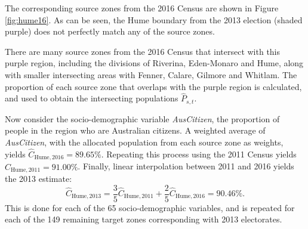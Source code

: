 \documentclass[11pt,a4paper,]{article}
\let\origtable\table
\let\endorigtable\endtable
\renewenvironment{table}[1][2] {
    \expandafter\origtable\expandafter[htbp]
} {
    \endorigtable
}
\begin{document}
The corresponding source zones from the 2016 Census are shown in Figure
\ref{fig:hume16}. As can be seen, the Hume boundary from the 2013
election (shaded purple) does not perfectly match any of the source
zones.

There are many source zones from the 2016 Census that intersect with
this purple region, including the divisions of Riverina, Eden-Monaro and
Hume, along with smaller intersecting areas with Fenner, Calare, Gilmore
and Whitlam. The proportion of each source zone that overlaps with the
purple region is calculated, and used to obtain the intersecting
populations \(\hat{P}_{s,t}\).

\begin{table}[H]
\centering\begingroup\fontsize{10}{12}\selectfont

\endgroup{}
\end{table}

Now consider the socio-demographic variable \emph{AusCitizen}, the
proportion of people in the region who are Australian citizens. A
weighted average of \emph{AusCitizen}, with the allocated population
from each source zone as weights, yields
\(\hat{C}_{\text{Hume},2016} = 89.65\%\). Repeating this process using
the 2011 Census yields \(\hat{C}_{\text{Hume},2011} = 91.00\%\).
Finally, linear interpolation between 2011 and 2016 yields the 2013
estimate: \[
  \hat{C}_{\text{Hume},2013}
    = \frac{3}{5} \hat{C}_{\text{Hume},2011} + \frac{2}{5} \hat{C}_{\text{Hume},2016}
    =  90.46\%.
\] This is done for each of the 65 socio-demographic variables, and is
repeated for each of the 149 remaining target zones corresponding with
2013 electorates.
\end{document}
